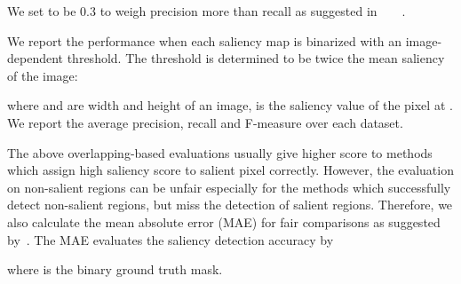 \documentclass[10pt,twocolumn,letterpaper]{article}
\begin{document}
\vspace{-0.5mm}
We set  to be 0.3 to weigh precision more than recall as suggested in~\cite{yan2013hierarchical}~\cite{wang2015deep}~\cite{borji2015salient}~\cite{yang2013saliency}.

We report the performance when each saliency map is binarized with an image-dependent threshold.
The threshold is determined to be twice the mean saliency of the image:

where  and  are width and height of an image,  is the saliency value of the pixel at
. We report the average precision, recall and F-measure over each dataset.

The above overlapping-based evaluations usually give higher score to methods which assign high saliency score to salient pixel correctly.
However, the evaluation on non-salient regions can be unfair especially for the methods which successfully detect non-salient regions, but miss the detection of salient regions.
Therefore, we also calculate the mean absolute error (MAE) for fair comparisons as suggested by~\cite{borji2015salient}.
The MAE evaluates the saliency detection accuracy by
\vspace{-1mm}

\vspace{-0.5mm}
where  is the binary ground truth mask.
\end{document}
